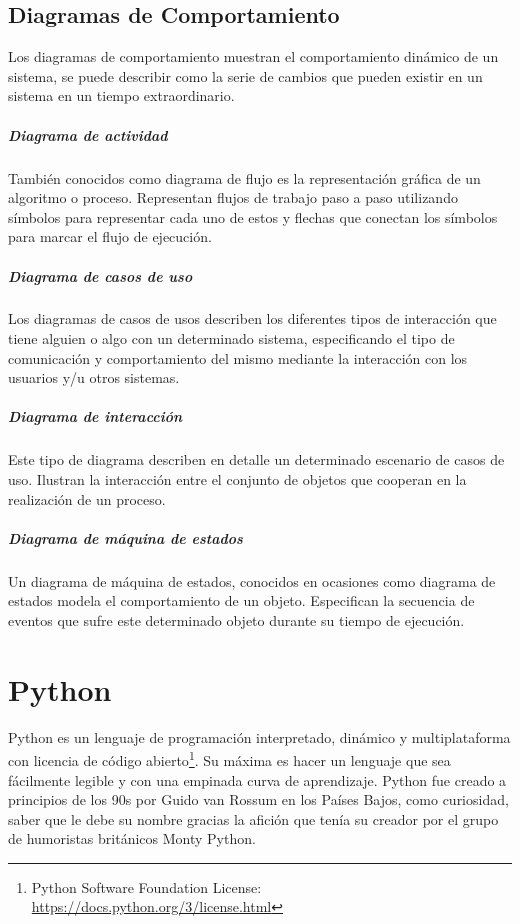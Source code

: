 \documentclass[a4paper, 12pt]{book}
\begin{document}
\subsection{Diagramas de Comportamiento}
Los diagramas de comportamiento muestran el comportamiento dinámico de un sistema, se puede describir como la serie de cambios que pueden existir en un sistema en un tiempo extraordinario.  
\subparagraph{Diagrama de actividad}
También conocidos como diagrama de flujo es la representación gráfica de un algoritmo o proceso. Representan flujos de trabajo paso a paso utilizando símbolos para representar cada uno de estos y flechas que conectan los símbolos para marcar el flujo de ejecución. 
\subparagraph{Diagrama de casos de uso}
Los diagramas de casos de usos describen los diferentes tipos de interacción que tiene alguien o algo con un determinado sistema, especificando el tipo de comunicación y comportamiento del mismo mediante la interacción con los usuarios y/u otros sistemas.
\subparagraph{Diagrama de interacción}
Este tipo de diagrama describen en detalle un determinado escenario de casos de uso. Ilustran la interacción entre el conjunto de objetos que cooperan en la realización de un proceso. 

\subparagraph{Diagrama de máquina de estados}
Un diagrama de máquina de estados, conocidos en ocasiones como diagrama de estados modela el comportamiento de un objeto. Especifican la secuencia de eventos que sufre este determinado objeto durante su tiempo de ejecución. 



\section{Python}
Python es un lenguaje de programación interpretado, dinámico y multiplataforma con licencia de código abierto\footnote{Python Software Foundation License: \url{https://docs.python.org/3/license.html}}. Su máxima es hacer un lenguaje que sea fácilmente legible y con una empinada curva de aprendizaje. Python fue creado a principios de los 90s por Guido van Rossum en los Países Bajos, como curiosidad, saber que le debe su nombre gracias la afición que tenía su creador por el grupo de humoristas británicos Monty Python. 
\end{document}

